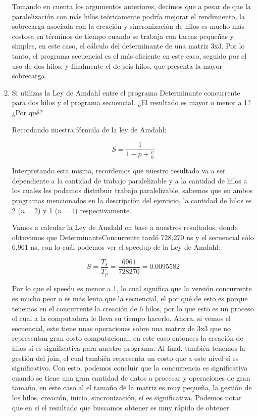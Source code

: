 \begin{enumerate}
Tomando en cuenta los argumentos anteriores, decimos que a pesar de que la paralelización con más hilos teóricamente podría mejorar el rendimiento, la sobrecarga asociada con la creación y sincronización de hilos es mucho más costosa en términos de tiempo cuando se trabaja con tareas pequeñas y simples, en este caso, el cálculo del determinante de una matriz 3x3. Por lo tanto, el programa secuencial es el más eficiente en este caso, seguido por el uso de dos hilos, y finalmente el de seis hilos, que presenta la mayor sobrecarga.


    \hfill    
    
    \item Si utilizas la Ley de Amdahl entre el programa Determinante concurrente para dos hilos y el programa secuencial. ¿El resultado es mayor o menor a 1? ¿Por qué?

    Recordando nuestra fórmula de la ley de Amdahl:

    \[ S = \frac{1}{1-p + \frac{p}{n}}\]

    Interpretando esta misma, recordemos que nuestro resultado va a ser dependiente a la cantidad de trabajo paralelizable y a la cantidad de hilos a los cuales les podamos distribuir trabajo paralelizable, sabemos que en ambos programas mencionados en la descripción del ejercicio, la cantidad de hilos es 2 ($n=2$) y 1 ($n=1$) respectivamente.

    Vamos a calcular la Ley de Amdahl en base a nuestros resultados, donde obtuvimos que DeterminanteConcurrente tardó 728,270 ns y el secuencial sólo 6,961 ns, con lo cuál
    podemos ver el speedup de la Ley de Amdahl:

    \[S = \frac{T_s}{T_p}=\frac{6961}{728270}=0.0095582\]

    Por lo que el speedu es menor a 1, lo cual significa que la versión concurrente es mucho peor o es más lenta que la secuencial, el por qué de esto es porque tenemos en el concurrente la creación de 6 hilos, por lo que esto es un proceso el cual a la computadora le lleva su tiempo hacerlo. Ahora, si vemos el secuencial, este tiene unas operaciones sobre una matriz de 3x3 que no representan gran costo computacional, en este caso entonces la creación de hilos sí es significativa para nuestro programa.
    Al final, también tenemos la gestión del join, el cual también representa un costo que a este nivel sí es significativo.
    Con esto, podemos concluir que la concurrencia es significativa cuando se tiene una gran cantidad de datos a procesar y operaciones de gran tamaño, en este caso al el tamaño
    de la matriz es muy pequeña, la gestión de los hilos, creación, inicio, sincronización, sí es significativa.
    Podemos notar que en sí el resultado que buscamos obtener es muy rápido de obtener.


\end{enumerate}
